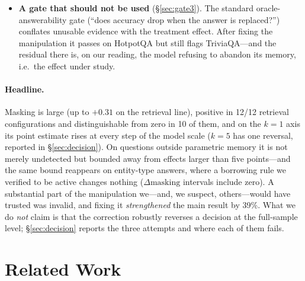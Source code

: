 \documentclass[11pt]{article}
\newcommand{\mask}{\ensuremath{\mathrm{masking}}}
\begin{document}
\begin{itemize}
substituted answer that was another accepted name for the \emph{true} answer, drawn from the
target question's own answer list, because a same-pool borrow sees that list and a topical
constraint prefers it. Closed-book accuracy on the planted key was exactly $0$ once we
guarded against it, and the first-pass effects disappeared. Any construction that borrows
values from the same pool is exposed to this whenever answers carry alias lists; our own main
corpus carries it at $0.5$--$0.9\%$ of items, which we quantify rather than disclose.
\item \textbf{A gate that should not be used} (\S\ref{sec:gate3}). The standard
oracle-answerability gate (``does accuracy drop when the answer is replaced?'') conflates
unusable evidence with the treatment effect. After fixing the manipulation it passes on
HotpotQA but still flags TriviaQA---and the residual there is, on our reading, the model
refusing to abandon its memory, i.e.\ the effect under study.
\end{itemize}

\paragraph{Headline.} Masking is large (up to $+0.31$ on the retrieval line), positive in
12/12 retrieval configurations and distinguishable from zero in 10 of them, and on the
$k{=}1$ axis its point estimate rises at every step of the model scale ($k{=}5$ has one
reversal, reported in \S\ref{sec:decision}). On questions outside parametric memory it is
not merely undetected but bounded away from effects larger than five points---and the same
bound reappears on entity-type answers, where a borrowing rule we verified to be active
changes nothing ($\Delta\mask$ intervals include zero). A substantial part of the
manipulation we---and, we suspect, others---would have trusted was invalid, and fixing it
\emph{strengthened} the main result by 39\%. What we do \emph{not} claim is that the correction
robustly reverses a decision at the full-sample level; \S\ref{sec:decision} reports the
three attempts and where each of them fails.

\section{Related Work}
\end{document}
